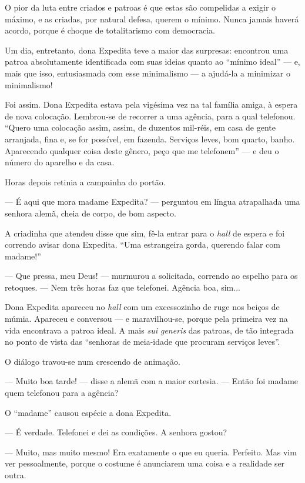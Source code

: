 O pior da luta entre criados e patroas é que estas são compelidas a
exigir o máximo, e as criadas, por natural defesa, querem o mínimo.
Nunca jamais haverá acordo, porque é choque de totalitarismo com
democracia.

Um dia, entretanto, dona Expedita teve a maior das surpresas: encontrou
uma patroa absolutamente identificada com suas ideias quanto ao ``mínimo
ideal'' --- e, mais que isso, entusiasmada com esse minimalismo --- a
ajudá-la a minimizar o minimalismo!

Foi assim. Dona Expedita estava pela vigésima vez na tal família amiga,
à espera de nova colocação. Lembrou-se de recorrer a uma agência, para a
qual telefonou. ``Quero uma colocação assim, assim, de duzentos
mil-réis, em casa de gente arranjada, fina e, se for possível, em
fazenda. Serviços leves, bom quarto, banho. Aparecendo qualquer coisa
deste gênero, peço que me telefonem'' --- e deu o número do aparelho e
da casa.

Horas depois retinia a campainha do portão.

--- É aqui que mora madame Expedita? --- perguntou em língua atrapalhada
uma senhora alemã, cheia de corpo, de bom aspecto.

A criadinha que atendeu disse que sim, fê-la entrar para o \emph{hall}
de espera e foi correndo avisar dona Expedita. ``Uma estrangeira gorda,
querendo falar com madame!''

--- Que pressa, meu Deus! --- murmurou a solicitada, correndo ao espelho
para os retoques. --- Nem três horas faz que telefonei. Agência boa,
sim...

Dona Expedita apareceu no \emph{hall} com um excessozinho de ruge nos
beiços de múmia. Apareceu e conversou --- e maravilhou-se, porque pela
primeira vez na vida encontrava a patroa ideal. A mais \emph{sui
generis} das patroas, de tão integrada no ponto de vista das ``senhoras
de meia-idade que procuram serviços leves''.

O diálogo travou-se num crescendo de animação.

--- Muito boa tarde! --- disse a alemã com a maior cortesia. --- Então
foi madame quem telefonou para a agência?

O ``madame'' causou espécie a dona Expedita.

--- É verdade. Telefonei e dei as condições. A senhora gostou?

--- Muito, mas muito mesmo! Era exatamente o que eu queria. Perfeito.
Mas vim ver pessoalmente, porque o costume é anunciarem uma coisa e a
realidade ser outra.

